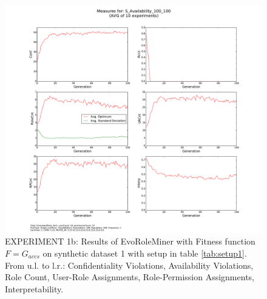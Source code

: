 \begin{figure}[H]
    \centering
    \includegraphics[scale=0.33, trim=4cm 2cm 4cm 0cm, clip=true]{./Figures/exp1accs}
    \caption{EXPERIMENT 1b: Results of EvoRoleMiner with Fitness function $F=G_{accs}$ on synthetic dataset 1 with setup in table \ref{tab:setup1}. From u.l. to l.r.: Confidentiality Violations, Availability Violations, Role Count, User-Role Assignments, Role-Permission Assignments, Interpretability.}
    \label{fig:exp1accs}
\end{figure}